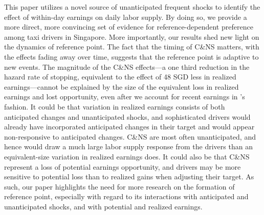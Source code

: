 \documentclass[reviewmode]{restat}
\begin{document}
This paper utilizes a novel source of unanticipated frequent shocks to identify the effect of within-day 
earnings on daily labor supply. By doing so, we provide a more direct, more convincing set of evidence for 
reference-dependent preference among taxi drivers in Singapore. More importantly, our results shed new light 
on the dynamics of reference point. The fact that the timing of C\&NS matters, with the effects fading away
over time, suggests that the reference point is adaptive to new events. The magnitude of the C\&NS effects---a
one third reduction in the hazard rate of stopping, equivalent to the effect of 48 SGD less in realized 
earnings---cannot be explained by the size of the equivalent loss in realized earnings and lost opportunity, 
even after we account for recent earnings in \citet{thakral2018daily}'s fashion. It could be that variation 
in realized earnings consists of both anticipated changes and unanticipated shocks, and sophisticated drivers 
would already have incorporated anticipated changes in their target and would appear non-responsive to
anticipated changes. C\&NS are most often unanticipated, and hence would draw a much large labor supply 
response from the drivers than an equivalent-size variation in realized earnings does. It could also be
that C\&NS represent a loss of potential earnings opportunity, and drivers may be more sensitive to potential
loss than to realized gains when adjusting their target. As such, our paper highlights the need for more research
on the formation of reference point, especially with regard to its interactions with anticipated and
unanticipated shocks, and with potential and realized earnings.
\end{document}
